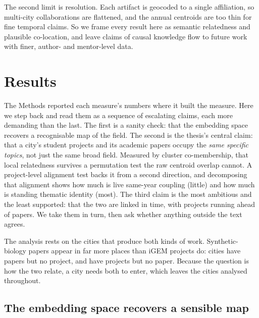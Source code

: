 \documentclass[12pt,a4paper]{article}
\begin{document}
	The second limit is resolution. Each artifact is geocoded to a single affiliation,
	so multi-city collaborations are flattened, and the annual centroids are too thin
	for fine temporal claims. So we frame every result here as semantic relatedness and
	plausible co-location, and leave claims of causal knowledge flow to future work
	with finer, author- and mentor-level data.
	
	\section{Results}
	
	The Methods reported each measure's numbers where it built the measure. Here we
	step back and read them as a sequence of escalating claims, each more demanding
	than the last. The first is a sanity check: that the embedding space recovers a
	recognisable map of the field. The second is the thesis's central claim: that a
	city's student projects and its academic papers occupy the \textit{same specific
		topics}, not just the same broad field. Measured by cluster co-membership, that
	local relatedness survives a permutation test the raw centroid overlap cannot. A
	project-level alignment test backs it from a second direction, and decomposing that
	alignment shows how much is live same-year coupling (little) and how much is
	standing thematic identity (most). The third claim is the most ambitious and the
	least supported: that the two are linked in time, with projects running ahead of
	papers. We take them in turn, then ask whether anything outside the text agrees.
	
	The analysis rests on the cities that produce both kinds of work. Synthetic-biology
	papers appear in far more places than iGEM projects do: \statNCitiesPapersOnly{}
	cities have papers but no project, and \statNCitiesProjectsOnly{} have projects but
	no paper. Because the question is how the two relate, a city needs both to enter,
	which leaves the \statNCitiesAnalyzed{} cities analysed throughout.
	
	\subsection{The embedding space recovers a sensible map}
	
\end{document}
